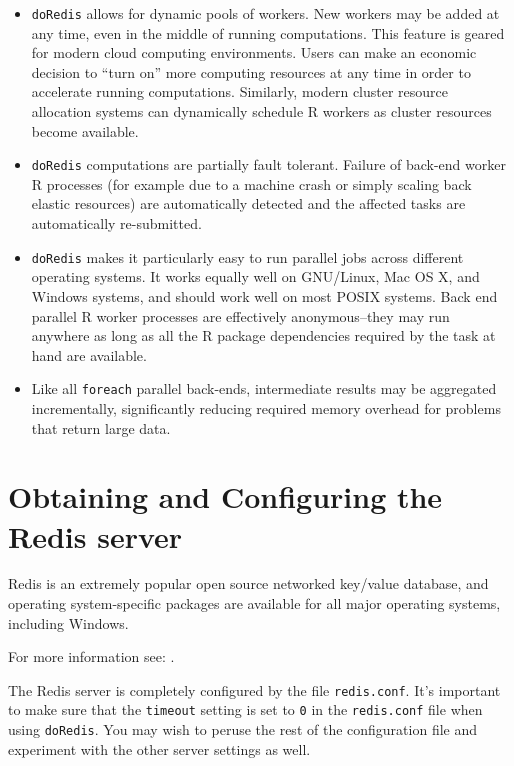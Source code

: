 \documentclass[12pt]{article}
\begin{document}
\begin{itemize}

\item {\tt doRedis} allows for dynamic pools of workers. New workers may be
added at any time, even in the middle of running computations.  This feature is
geared for modern cloud computing environments.  Users can make an economic
decision to ``turn on'' more computing resources at any time in order to
accelerate running computations. Similarly, modern cluster resource allocation
systems can dynamically schedule R workers as cluster resources become
available.

\item {\tt doRedis} computations are partially fault tolerant. Failure of
back-end worker R processes (for example due to a machine crash or simply
scaling back elastic resources) are automatically detected and the affected
tasks are automatically re-submitted.

\item {\tt doRedis} makes it particularly easy to run parallel jobs across
different operating systems. It works equally well on GNU/Linux, Mac OS X, and
Windows systems, and should work well on most POSIX systems.  Back end parallel
R worker processes are effectively anonymous--they may run anywhere as long as
all the R package dependencies required by the task at hand are available.

\item Like all {\tt foreach} parallel back-ends, intermediate results may be
aggregated incrementally, significantly reducing required memory overhead for
problems that return large data.

\end{itemize}





\section{Obtaining and Configuring the Redis server}\label{install}

Redis is an extremely popular open source networked key/value database, and
operating system-specific packages are available for all major operating
systems, including Windows.

For more information see:
.

The Redis server is completely configured by the file \verb+redis.conf+.  It's
important to make sure that the \verb+timeout+ setting is set to \verb+0+ in
the \verb+redis.conf+ file when using {\tt doRedis}.  You may wish to peruse
the rest of the configuration file and experiment with the other server
settings as well.
\end{document}
